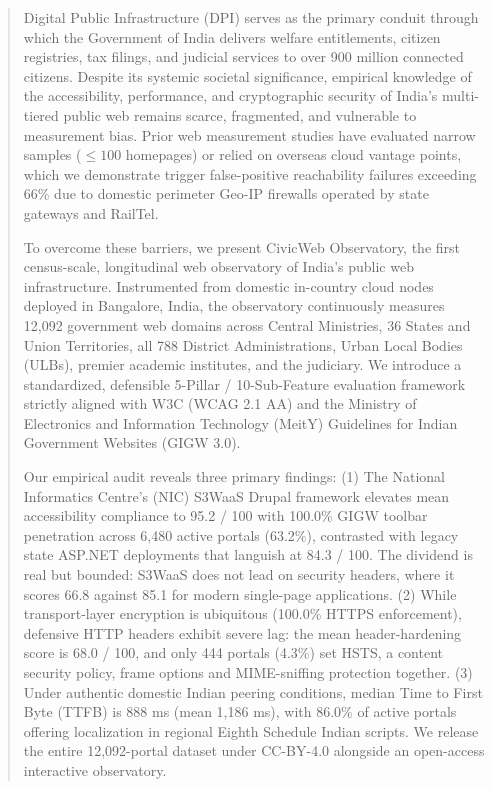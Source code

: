\documentclass[conference]{IEEEtran}
\begin{document}
\begin{abstract}
Digital Public Infrastructure (DPI) serves as the primary conduit through which the Government of India delivers welfare entitlements, citizen registries, tax filings, and judicial services to over 900 million connected citizens. Despite its systemic societal significance, empirical knowledge of the accessibility, performance, and cryptographic security of India's multi-tiered public web remains scarce, fragmented, and vulnerable to measurement bias. Prior web measurement studies have evaluated narrow samples ($\le 100$ homepages) or relied on overseas cloud vantage points, which we demonstrate trigger false-positive reachability failures exceeding 66\% due to domestic perimeter Geo-IP firewalls operated by state gateways and RailTel. 

To overcome these barriers, we present CivicWeb Observatory, the first census-scale, longitudinal web observatory of India's public web infrastructure. Instrumented from domestic in-country cloud nodes deployed in Bangalore, India, the observatory continuously measures 12,092 government web domains across Central Ministries, 36 States and Union Territories, all 788 District Administrations, Urban Local Bodies (ULBs), premier academic institutes, and the judiciary. We introduce a standardized, defensible 5-Pillar / 10-Sub-Feature evaluation framework strictly aligned with W3C (WCAG 2.1 AA) and the Ministry of Electronics and Information Technology (MeitY) Guidelines for Indian Government Websites (GIGW 3.0).

Our empirical audit reveals three primary findings: (1) The National Informatics Centre's (NIC) S3WaaS Drupal framework elevates mean accessibility compliance to 95.2 / 100 with 100.0\% GIGW toolbar penetration across 6,480 active portals (63.2\%), contrasted with legacy state ASP.NET deployments that languish at 84.3 / 100. The dividend is real but bounded: S3WaaS does not lead on security headers, where it scores 66.8 against 85.1 for modern single-page applications. (2) While transport-layer encryption is ubiquitous (100.0\% HTTPS enforcement), defensive HTTP headers exhibit severe lag: the mean header-hardening score is 68.0 / 100, and only 444 portals (4.3\%) set HSTS, a content security policy, frame options and MIME-sniffing protection together. (3) Under authentic domestic Indian peering conditions, median Time to First Byte (TTFB) is 888 ms (mean 1,186 ms), with 86.0\% of active portals offering localization in regional Eighth Schedule Indian scripts. We release the entire 12,092-portal dataset under CC-BY-4.0 alongside an open-access interactive observatory.
\end{abstract}
\end{document}
